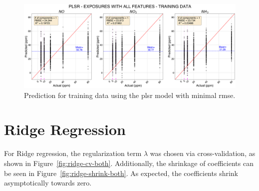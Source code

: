 \begin{figure}[!h]
	\centering
	\includegraphics[width=1\textwidth]{../figures/PLSR-TRAINING-DATA.png}
	\caption{Prediction for training data using the \acrshort{plsr} model with minimal \acrshort{rmse}.}
	\label{fig:plsr-TRAIN-PRED}
\end{figure}


\clearpage
\section{Ridge Regression}
\label{sec:results-ridge}

For Ridge regression, the regularization term $\lambda$ was chosen via cross-validation, as shown in Figure~\ref{fig:ridge-cv-both}. Additionally, the shrinkage of coefficients can be seen in Figure~\ref{fig:ridge-shrink-both}. As expected, the coefficients shrink asymptotically towards zero.

